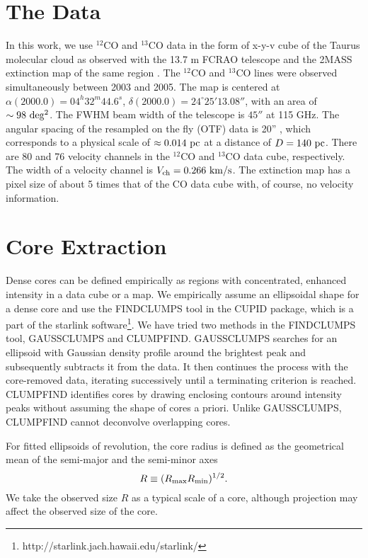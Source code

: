 \documentclass[12pt,preprint]{aastex}
\begin{document}
\section{The Data}
\label{sec:data}

In this work, we use $^{12}$CO and $^{13}$CO data in the form of x-y-v cube of
the Taurus molecular cloud as observed with the 13.7 m FCRAO telescope
\citep{Taurus_CO} and the 2MASS extinction map of the same region
\citep{2MASS}. The $^{12}$CO and $^{13}$CO lines were observed
simultaneously between  2003 and 2005. The map is centered
at $\alpha(2000.0)=04^h 32^m 44.6^s$, $\delta(2000.0)=24^\circ 25'
13.08''$, with an area of $\sim 98\ \rm deg^2$. The FWHM beam width
of the telescope is $45''$ at 115 GHz. The angular spacing of the resampled
on the fly (OTF) data is 20'' \citep{Goldsmith2008}, which corresponds to
a physical scale of $\approx 0.014\rm\ pc$ at a distance of $D=140\
{\rm pc}$. There are 80 and 76 velocity channels in
the $^{12}$CO and $^{13}$CO data cube, respectively. The width of a velocity
channel is $V_{\rm ch}=0.266 \rm\ km/s$. The extinction map has a
pixel size of about 5 times that of the CO data cube with, of course, no
velocity information.

\section{Core Extraction}
\label{sec:methods}

Dense cores can be defined empirically as regions with concentrated,
enhanced intensity in a data cube or a map. We empirically assume
an ellipsoidal shape for a dense core and use the FINDCLUMPS tool in the
CUPID package, which is a part of the starlink
software\footnote{http://starlink.jach.hawaii.edu/starlink/}. We
have tried two methods in the FINDCLUMPS tool, GAUSSCLUMPS and
CLUMPFIND. GAUSSCLUMPS searches for an ellipsoid with Gaussian
density profile around the brightest peak and subsequently
subtracts it from the data. It then continues the process with the core-removed data, iterating successively until a
terminating criterion is reached.
CLUMPFIND identifies cores by drawing
enclosing contours around intensity peaks without assuming the shape
of cores a priori. Unlike GAUSSCLUMPS, CLUMPFIND cannot deconvolve
overlapping cores.

For fitted ellipsoids of revolution, the core radius is defined as the geometrical mean of
the semi-major and the semi-minor axes
\begin{equation}
R \equiv (R_{\rm max}R_{\rm min})^{1/2}.
\end{equation}
We take the observed size $R$ as a typical scale of a core,
although projection may affect the observed size of the core.
\end{document}
